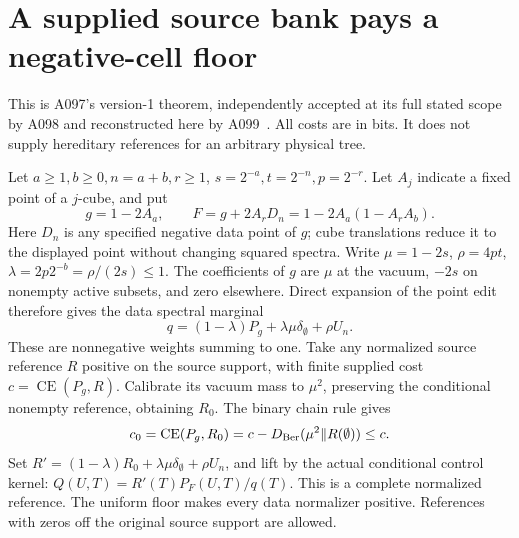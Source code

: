 \documentclass[11pt]{article}
\begin{document}
\section{A supplied source bank pays a negative-cell floor}
\label{sec:floor}
This is A097's version-1 theorem, independently accepted at its full stated
scope by A098 and reconstructed here by A099~\cite{A097e,A098e}. All costs are in bits. It
does not supply hereditary references for an arbitrary physical tree.

Let $a\ge1,b\ge0,n=a+b,r\ge1$, $s=2^{-a},t=2^{-n},p=2^{-r}$.
Let $A_j$ indicate a fixed point of a $j$-cube, and put
\[
 g=1-2A_a,\qquad F=g+2A_rD_n=1-2A_a(1-A_rA_b).
\]
Here $D_n$ is any specified negative data point of $g$; cube translations
reduce it to the displayed point without changing squared spectra.
Write $\mu=1-2s$, $\rho=4pt$, $\lambda=2p2^{-b}=\rho/(2s)\le1$.
The coefficients of $g$ are $\mu$ at the vacuum, $-2s$ on nonempty
active subsets, and zero elsewhere. Direct expansion of the point edit
therefore gives the data spectral marginal
\[
 q=(1-\lambda)P_g+\lambda\mu\delta_\emptyset+\rho U_n.
\]
These are nonnegative weights summing to one. Take any normalized source
reference $R$ positive on the source support, with finite supplied cost
$c=\operatorname{CE}(P_g,R)$. Calibrate its vacuum mass to $\mu^2$,
preserving the conditional nonempty reference, obtaining $R_0$. The
binary chain rule gives
\[
 c_0=\operatorname{CE}(P_g,R_0)
 =c-D_{\rm Ber}(\mu^2\Vert R(\emptyset))\le c.
\]
Set $R'=(1-\lambda)R_0+\lambda\mu\delta_\emptyset+\rho U_n$,
and lift by the actual conditional control kernel:
$Q(U,T)=R'(T)P_F(U,T)/q(T)$. This is a complete normalized reference.
The uniform floor makes every data normalizer positive. References with
zeros off the original source support are allowed.
\end{document}
